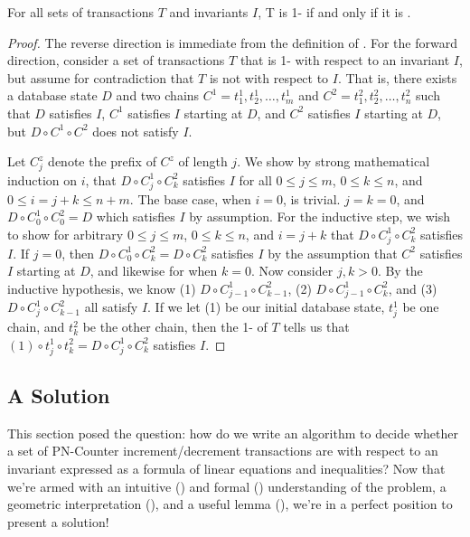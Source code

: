\begin{theorem}\label{thm:one-is-enough}
  For all sets of transactions $T$ and invariants $I$, T is 1-\iconfluent{} if
  and only if it is \iconfluent{}.
\end{theorem}
\begin{proof}
  The reverse direction is immediate from the definition of \iconfluence{}. For
  the forward direction, consider a set of transactions $T$ that is
  1-\iconfluent{} with respect to an invariant $I$, but assume for
  contradiction that $T$ is not \iconfluent{} with respect to $I$. That is,
  there exists a database state $D$ and two chains $C^1 = t^1_1, t^1_2, \ldots,
  t^1_m$ and $C^2 = t^2_1, t^2_2, \ldots, t^2_n$ such that $D$ satisfies $I$,
  $C^1$ satisfies $I$ starting at $D$, and $C^2$ satisfies $I$ starting at $D$,
  but $D \circ C^1 \circ C^2$ does not satisfy $I$.

  Let $C^z_j$ denote the prefix of $C^z$ of length $j$. We show by strong
  mathematical induction on $i$, that $D \circ C^1_j \circ C^2_k$ satisfies $I$
  for all $0 \leq j \leq m$, $0 \leq k \leq n$, and $0 \leq i = j + k \leq n +
  m$.
  The base case, when $i = 0$, is trivial. $j = k = 0$, and $D \circ C^1_0
  \circ C^2_0 = D$ which satisfies $I$ by assumption.
  For the inductive step, we wish to show for arbitrary $0 \leq j \leq m$, $0
  \leq k \leq n$, and $i = j + k$ that $D \circ C^1_j \circ C^2_k$ satisfies
  $I$. If $j = 0$, then $D \circ C^1_0 \circ C^2_k = D \circ C^2_k$ satisfies
  $I$ by the assumption that $C^2$ satisfies $I$ starting at $D$, and likewise
  for when $k = 0$. Now consider $j, k > 0$. By the inductive hypothesis, we
  know
    (1) $D \circ C^1_{j-1} \circ C^2_{k-1}$,
    (2) $D \circ C^1_{j-1} \circ C^2_{k}$, and
    (3) $D \circ C^1_{j}   \circ C^2_{k-1}$
  all satisfy $I$. If we let (1) be our initial database state, $t^1_j$ be one
  chain, and $t^2_k$ be the other chain, then the 1-\iconfluence{} of $T$ tells
  us that $(1) \circ t^1_j \circ t^2_k = D \circ C^1_j \circ C^2_k$ satisfies
  $I$.
\end{proof}

\subsection{A Solution}
This section posed the question: how do we write an algorithm to decide whether
a set of PN-Counter increment/decrement transactions are \iconfluent{} with
respect to an invariant expressed as a formula of linear equations and
inequalities?  Now that we're armed with an intuitive
() and formal ()
understanding of the problem, a geometric interpretation
(), and a useful lemma (), we're
in a perfect position to present a solution!

